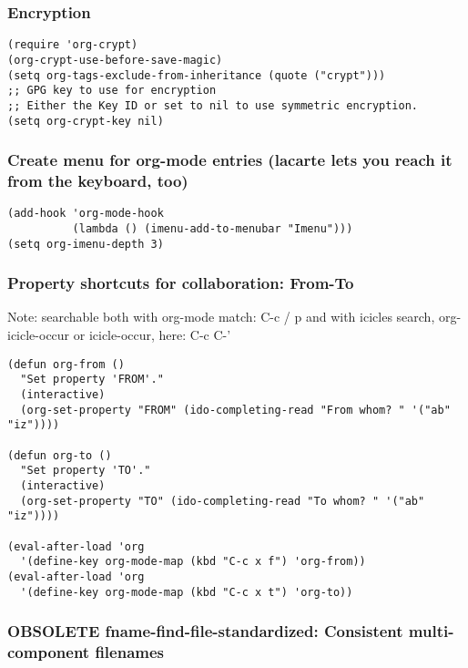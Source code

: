 \documentclass{article}
\begin{document}
\subsubsection{Encryption}
\label{sec-2-5-15}

\begin{verbatim}
(require 'org-crypt)
(org-crypt-use-before-save-magic)
(setq org-tags-exclude-from-inheritance (quote ("crypt")))
;; GPG key to use for encryption
;; Either the Key ID or set to nil to use symmetric encryption.
(setq org-crypt-key nil)
\end{verbatim}

\subsubsection{Create menu for org-mode entries (lacarte lets you reach it from the keyboard, too)}
\label{sec-2-5-16}

\begin{verbatim}
(add-hook 'org-mode-hook
          (lambda () (imenu-add-to-menubar "Imenu")))
(setq org-imenu-depth 3)
\end{verbatim}

\subsubsection{Property shortcuts for collaboration: From-To}
\label{sec-2-5-17}

Note: searchable both with org-mode match: C-c / p and with icicles search,
org-icicle-occur or icicle-occur, here: C-c C-'

\begin{verbatim}
(defun org-from ()
  "Set property 'FROM'."
  (interactive)
  (org-set-property "FROM" (ido-completing-read "From whom? " '("ab" "iz"))))

(defun org-to ()
  "Set property 'TO'."
  (interactive)
  (org-set-property "TO" (ido-completing-read "To whom? " '("ab" "iz"))))

(eval-after-load 'org
  '(define-key org-mode-map (kbd "C-c x f") 'org-from))
(eval-after-load 'org
  '(define-key org-mode-map (kbd "C-c x t") 'org-to))
\end{verbatim}

\subsubsection{{\bfseries\sffamily OBSOLETE} fname-find-file-standardized: Consistent multi-component filenames}
\label{sec-2-5-18}
\end{document}
